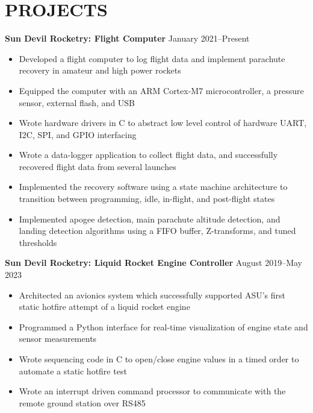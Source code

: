 \documentclass{article}
\begin{document}
\section{PROJECTS}
\textbf{Sun Devil Rocketry: Flight Computer}
\hfill
\vspace{0.5em}
January 2021--Present
\begin{itemize}
\item{Developed a flight computer to log flight data and implement parachute recovery in amateur and high power rockets}
\item{Equipped the computer with an ARM Cortex-M7 microcontroller, a pressure sensor, external flash, and USB}
\item{Wrote hardware drivers in C to abstract low level control of hardware UART, I2C, SPI, and GPIO interfacing}
\item{Wrote a data-logger application to collect flight data, and successfully recovered flight data from several launches}
\item{Implemented the recovery software using a state machine architecture to transition between programming, idle, in-flight, and post-flight states}
\item{Implemented apogee detection, main parachute altitude detection, and landing detection algorithms using a FIFO buffer, Z-transforms, and tuned thresholds}
\end{itemize}
\vspace{1em}
\textbf{Sun Devil Rocketry: Liquid Rocket Engine Controller}
\hfill
\vspace{0.5em}
August 2019--May 2023
\begin{itemize}
\item{Architected an avionics system which successfully supported ASU's first static hotfire attempt of a liquid rocket engine}
\item{Programmed a Python interface for real-time visualization of engine state and sensor measurements}
\item{Wrote sequencing code in C to open/close engine values in a timed order to automate a static hotfire test }
\item{Wrote an interrupt driven command processor to communicate with the remote ground station over RS485}
\end{itemize}
\vspace{0.5em}
\thispagestyle{empty}
\end{document}
